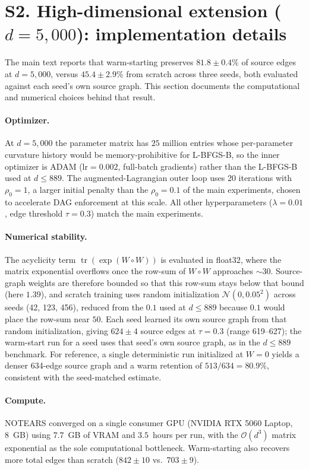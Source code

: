 \documentclass[11pt]{article}
\begin{document}
\section*{S2. High-dimensional extension ($d = 5{,}000$): implementation details}

The main text reports that warm-starting preserves $81.8\pm0.4\%$ of source edges at
$d=5{,}000$, versus $45.4\pm2.9\%$ from scratch across three seeds, both evaluated against
each seed's own source graph. This section documents the computational and numerical
choices behind that result.

\paragraph{Optimizer.} At $d=5{,}000$ the parameter matrix has $25$ million entries whose
per-parameter curvature history would be memory-prohibitive for L-BFGS-B, so the inner
optimizer is ADAM ($\mathrm{lr}=0.002$, full-batch gradients) rather than the L-BFGS-B
used at $d\le889$. The augmented-Lagrangian outer loop uses 20 iterations with
$\rho_0=1$, a larger initial penalty than the $\rho_0=0.1$ of the main experiments, chosen
to accelerate DAG enforcement at this scale. All other hyperparameters ($\lambda=0.01$,
edge threshold $\tau=0.3$) match the main experiments.

\paragraph{Numerical stability.} The acyclicity term
$\operatorname{tr}(\exp(W\circ W))$ is evaluated in float32, where the matrix exponential
overflows once the row-sum of $W\circ W$ approaches $\sim$30. Source-graph weights are
therefore bounded so that this row-sum stays below that bound (here $1.39$), and scratch
training uses random initialization $\mathcal{N}(0,0.05^2)$ across seeds (42, 123, 456),
reduced from the $0.1$ used at $d\le889$ because $0.1$ would place the row-sum near $50$.
Each seed learned its own source graph from that random initialization, giving
$624\pm4$ source edges at $\tau=0.3$ (range 619--627); the warm-start run for a seed
uses that seed's own source graph, as in the $d\le889$ benchmark. For reference, a single
deterministic run initialized at $W=0$ yields a denser 634-edge source graph and a warm
retention of $513/634=80.9\%$, consistent with the seed-matched estimate.

\paragraph{Compute.} NOTEARS converged on a single consumer GPU (NVIDIA RTX 5060 Laptop,
8~GB) using $7.7$~GB of VRAM and $3.5$~hours per run, with the $\mathcal{O}(d^3)$ matrix
exponential as the sole computational bottleneck. Warm-starting also recovers more total
edges than scratch ($842\pm10$ vs.\ $703\pm9$).
\end{document}
